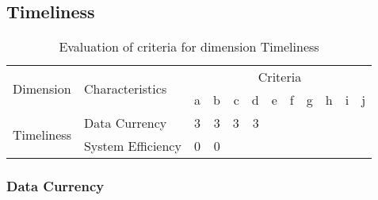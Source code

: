 \newpage
\subsection{Timeliness}

\begin{table}[htbp]
    \centering

    \begin{tabular}{llrrrrrrrrrr}
        \toprule
        \multirow{2}{*}{Dimension}  & \multirow{2}{*}{Characteristics}  & \multicolumn{10}{c}{Criteria}         \\ \cmidrule(lr){3-12}
                                    &                                   & a & b & c & d & e & f & g & h & i & j \\ \midrule
        \multirow{2}{*}{Timeliness} & Data Currency                     & 3 & 3 & 3 & 3 &   &   &   &   &   &   \\
                                    & System Efficiency                 & 0 & 0 &   &   &   &   &   &   &   &   \\
        \bottomrule
    \end{tabular}

    \caption{Evaluation of criteria for dimension Timeliness}
    \label{table:timeliness-benchmark}
\end{table}
\FloatBarrier

\subsubsection{Data Currency}

